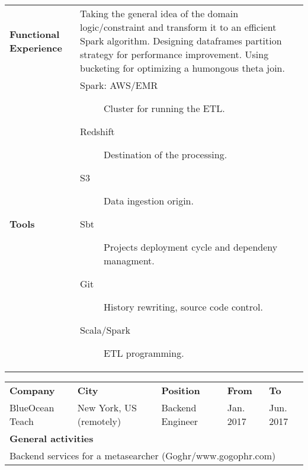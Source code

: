 \begin{cventries}
\begin{tabular}{|p{4.5cm} p{2cm} p{4cm} p{2cm} p{2cm}|}
    \textbf{Functional Experience} & \multicolumn{4}{p{12cm}|}{

 Taking the general idea of the domain logic/constraint and transform it to an efficient Spark algorithm. Designing dataframes partition strategy for performance improvement. Using bucketing for optimizing a humongous theta join.
      
      } \\

      \textbf{Tools} & \multicolumn{4}{p{12cm}|}{
                       \begin{description}
                       \item[Spark: AWS/EMR] Cluster for running the ETL.
            
                       \item[Redshift] Destination of the processing.
                       \item[S3] Data ingestion origin.

                       \item[Sbt] Projects deployment cycle and dependeny managment.
                       \item[Git] History rewriting, source code control.

                       \item[Scala/Spark] ETL programming.

                       \end{description}
      } \\
 

    \hline

  \end{tabular}



 \begin{tabular}{|p{4.5cm} p{2cm} p{4cm} p{2cm} p{2cm}|}
    \hline
    \textbf{Company} & 
    \textbf{City} & 
    \textbf{Position} & 
    \textbf{From} & \textbf{To} \\
    BlueOcean Teach & 
    New York, US \hspace{1cm} (remotely) & 
    Backend Engineer & 
    
    Jan. 2017 & Jun. 2017 \\ 

    \multicolumn{5}{|l|}{\textbf{General activities}} \\

     \multicolumn{5}{|p{15cm}|}{
       Backend services for a metasearcher (Goghr/www.gogophr.com)
       } \\


\end{tabular}
\end{cventries}
